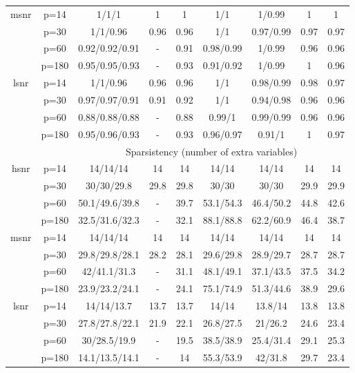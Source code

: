 \begin{table}[ht]
{\begin{tabular}{|c|c|ccccccc|}
  \midrule\multirow{4}[2]{*}{msnr} & p=14 & 1/1/1 & 1 & 1 & 1/1 & 1/0.99 & 1 & 1 \\ 
   & p=30 & 1/1/0.96 & 0.96 & 0.96 & 1/1 & 0.97/0.99 & 0.97 & 0.97 \\ 
   & p=60 & 0.92/0.92/0.91 & - & 0.91 & 0.98/0.99 & 1/0.99 & 0.96 & 0.96 \\ 
   & p=180 & 0.95/0.95/0.93 & - & 0.93 & 0.91/0.92 & 1/0.99 & 1 & 0.96 \\ 
  \midrule\multirow{4}[2]{*}{lsnr} & p=14 & 1/1/0.96 & 0.96 & 0.96 & 1/1 & 0.98/0.99 & 0.98 & 0.97 \\ 
   & p=30 & 0.97/0.97/0.91 & 0.91 & 0.92 & 1/1 & 0.94/0.98 & 0.96 & 0.96 \\ 
   & p=60 & 0.88/0.88/0.88 & - & 0.88 & 0.99/1 & 0.99/0.99 & 0.96 & 0.96 \\ 
   & p=180 & 0.95/0.96/0.93 & - & 0.93 & 0.96/0.97 & 0.91/1 & 1 & 0.97 \\ 
   \midrule 
 \multicolumn{1}{|c}{} &       & \multicolumn{7}{c|}{Sparsistency (number of extra variables)} \\
\midrule\multirow{4}[2]{*}{hsnr} & p=14 & 14/14/14 & 14 & 14 & 14/14 & 14/14 & 14 & 14 \\ 
   & p=30 & 30/30/29.8 & 29.8 & 29.8 & 30/30 & 30/30 & 29.9 & 29.9 \\ 
   & p=60 & 50.1/49.6/39.8 & - & 39.7 & 53.1/54.3 & 46.4/50.2 & 44.8 & 42.6 \\ 
   & p=180 & 32.5/31.6/32.3 & - & 32.1 & 88.1/88.8 & 62.2/60.9 & 46.4 & 38.7 \\ 
  \midrule\multirow{4}[2]{*}{msnr} & p=14 & 14/14/14 & 14 & 14 & 14/14 & 14/14 & 14 & 14 \\ 
   & p=30 & 29.8/29.8/28.1 & 28.2 & 28.1 & 29.6/29.8 & 28.9/29.7 & 28.7 & 28.7 \\ 
   & p=60 & 42/41.1/31.3 & - & 31.1 & 48.1/49.1 & 37.1/43.5 & 37.5 & 34.2 \\ 
   & p=180 & 23.9/23.2/24.1 & - & 24.1 & 75.1/74.9 & 51.3/44.6 & 38.9 & 29.6 \\ 
  \midrule\multirow{4}[2]{*}{lsnr} & p=14 & 14/14/13.7 & 13.7 & 13.7 & 14/14 & 13.8/14 & 13.8 & 13.8 \\ 
   & p=30 & 27.8/27.8/22.1 & 21.9 & 22.1 & 26.8/27.5 & 21/26.2 & 24.6 & 23.4 \\ 
   & p=60 & 30/28.5/19.9 & - & 19.5 & 38.5/38.9 & 25.4/31.4 & 29.1 & 25.3 \\ 
   & p=180 & 14.1/13.5/14.1 & - & 14 & 55.3/53.9 & 42/31.8 & 29.7 & 23.4 \\ 
   \bottomrule 
\end{tabular}
}
\end{table}
